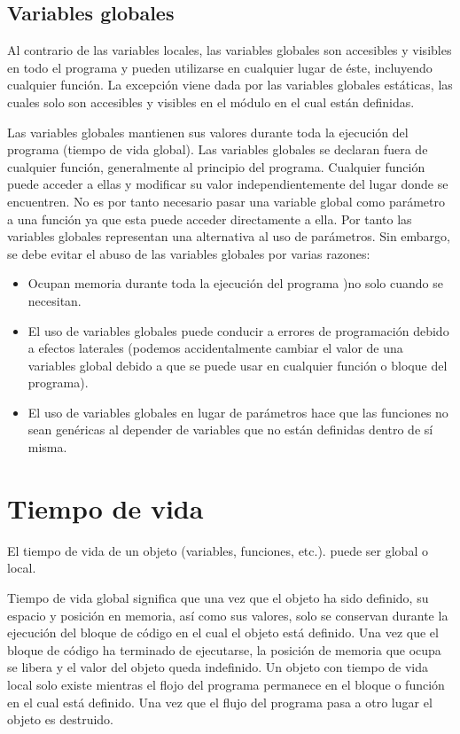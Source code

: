 \subsection{Variables globales}{
Al contrario de las variables locales, las variables globales son accesibles y visibles en todo el programa y pueden utilizarse en cualquier lugar de éste, incluyendo cualquier función. La excepción viene dada por las variables globales estáticas, las cuales solo son accesibles y visibles en el módulo en el cual están definidas.

Las variables globales mantienen sus valores durante toda la ejecución del programa (tiempo de vida global). Las variables globales se declaran fuera de cualquier función, generalmente al principio del programa. Cualquier función puede acceder a ellas y modificar su valor independientemente del lugar donde se encuentren. No es por tanto necesario pasar una variable global como parámetro a una función ya que esta puede acceder directamente a ella. Por tanto las variables globales representan una alternativa al uso de parámetros. Sin embargo, se debe evitar el abuso de las variables globales por varias razones:
\begin{itemize}
	\item Ocupan memoria durante toda la ejecución del programa )no solo cuando se necesitan.
	\item El uso de variables globales puede conducir a errores de programación debido a efectos laterales (podemos accidentalmente cambiar el valor de una variables global debido a que se puede usar en cualquier función o bloque del programa).
	\item El uso de variables globales en lugar de parámetros hace que las funciones no sean genéricas al depender de variables que no están definidas dentro de sí misma.
\end{itemize}
}
\section{Tiempo de vida}
El tiempo de vida de un objeto (variables, funciones, etc.). puede ser global o local.

Tiempo de vida global significa que una vez que el objeto ha sido definido, su espacio y posición en memoria, así como sus valores, solo se conservan durante la ejecución del bloque de código en el cual el objeto está definido. Una vez que el bloque de código ha terminado de ejecutarse, la posición de memoria que ocupa se libera y el valor del objeto queda indefinido. Un objeto con tiempo de vida local solo existe mientras el flojo del programa permanece en el bloque o función en el cual está definido. Una vez que el flujo del programa pasa a otro lugar el objeto es destruido.

